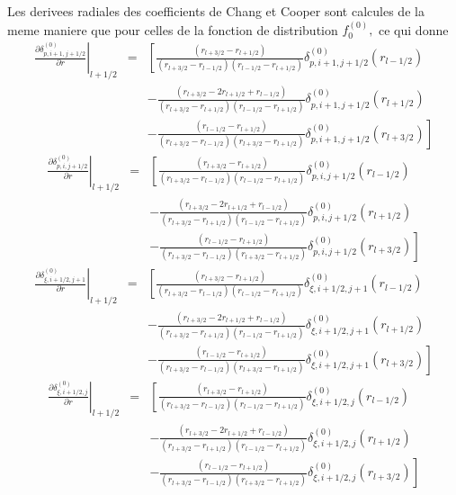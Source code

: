 Les derivees radiales des coefficients de Chang et Cooper sont calcules
de la meme maniere que pour celles de la fonction de distribution
$f_{0}^{\left(0\right)},$ ce qui donne \begin{eqnarray*}
\left.\frac{\partial\delta_{p,i+1,j+1/2}^{(0)}}{\partial r}\right|_{l+1/2} & = & \left[\frac{\left(r_{l+3/2}-r_{l+1/2}\right)}{\left(r_{l+3/2}-r_{l-1/2}\right)\left(r_{l-1/2}-r_{l+1/2}\right)}\delta_{p,i+1,j+1/2}^{(0)}\left(r_{l-1/2}\right)\right.\\
 &  & -\frac{\left(r_{l+3/2}-2r_{l+1/2}+r_{l-1/2}\right)}{\left(r_{l+3/2}-r_{l+1/2}\right)\left(r_{l-1/2}-r_{l+1/2}\right)}\delta_{p,i+1,j+1/2}^{(0)}\left(r_{l+1/2}\right)\\
 &  & -\left.\frac{\left(r_{l-1/2}-r_{l+1/2}\right)}{\left(r_{l+3/2}-r_{l-1/2}\right)\left(r_{l+3/2}-r_{l+1/2}\right)}\delta_{p,i+1,j+1/2}^{(0)}\left(r_{l+3/2}\right)\right]\end{eqnarray*}
\begin{eqnarray*}
\left.\frac{\partial\delta_{p,i,j+1/2}^{(0)}}{\partial r}\right|_{l+1/2} & = & \left[\frac{\left(r_{l+3/2}-r_{l+1/2}\right)}{\left(r_{l+3/2}-r_{l-1/2}\right)\left(r_{l-1/2}-r_{l+1/2}\right)}\delta_{p,i,j+1/2}^{(0)}\left(r_{l-1/2}\right)\right.\\
 &  & -\frac{\left(r_{l+3/2}-2r_{l+1/2}+r_{l-1/2}\right)}{\left(r_{l+3/2}-r_{l+1/2}\right)\left(r_{l-1/2}-r_{l+1/2}\right)}\delta_{p,i,j+1/2}^{(0)}\left(r_{l+1/2}\right)\\
 &  & -\left.\frac{\left(r_{l-1/2}-r_{l+1/2}\right)}{\left(r_{l+3/2}-r_{l-1/2}\right)\left(r_{l+3/2}-r_{l+1/2}\right)}\delta_{p,i,j+1/2}^{(0)}\left(r_{l+3/2}\right)\right]\end{eqnarray*}
\begin{eqnarray*}
\left.\frac{\partial\delta_{\xi,i+1/2,j+1}^{(0)}}{\partial r}\right|_{l+1/2} & = & \left[\frac{\left(r_{l+3/2}-r_{l+1/2}\right)}{\left(r_{l+3/2}-r_{l-1/2}\right)\left(r_{l-1/2}-r_{l+1/2}\right)}\delta_{\xi,i+1/2,j+1}^{(0)}\left(r_{l-1/2}\right)\right.\\
 &  & -\frac{\left(r_{l+3/2}-2r_{l+1/2}+r_{l-1/2}\right)}{\left(r_{l+3/2}-r_{l+1/2}\right)\left(r_{l-1/2}-r_{l+1/2}\right)}\delta_{\xi,i+1/2,j+1}^{(0)}\left(r_{l+1/2}\right)\\
 &  & -\left.\frac{\left(r_{l-1/2}-r_{l+1/2}\right)}{\left(r_{l+3/2}-r_{l-1/2}\right)\left(r_{l+3/2}-r_{l+1/2}\right)}\delta_{\xi,i+1/2,j+1}^{(0)}\left(r_{l+3/2}\right)\right]\end{eqnarray*}
\begin{eqnarray*}
\left.\frac{\partial\delta_{\xi,i+1/2,j}^{(0)}}{\partial r}\right|_{l+1/2} & = & \left[\frac{\left(r_{l+3/2}-r_{l+1/2}\right)}{\left(r_{l+3/2}-r_{l-1/2}\right)\left(r_{l-1/2}-r_{l+1/2}\right)}\delta_{\xi,i+1/2,j}^{(0)}\left(r_{l-1/2}\right)\right.\\
 &  & -\frac{\left(r_{l+3/2}-2r_{l+1/2}+r_{l-1/2}\right)}{\left(r_{l+3/2}-r_{l+1/2}\right)\left(r_{l-1/2}-r_{l+1/2}\right)}\delta_{\xi,i+1/2,j}^{(0)}\left(r_{l+1/2}\right)\\
 &  & -\left.\frac{\left(r_{l-1/2}-r_{l+1/2}\right)}{\left(r_{l+3/2}-r_{l-1/2}\right)\left(r_{l+3/2}-r_{l+1/2}\right)}\delta_{\xi,i+1/2,j}^{(0)}\left(r_{l+3/2}\right)\right]\end{eqnarray*}

